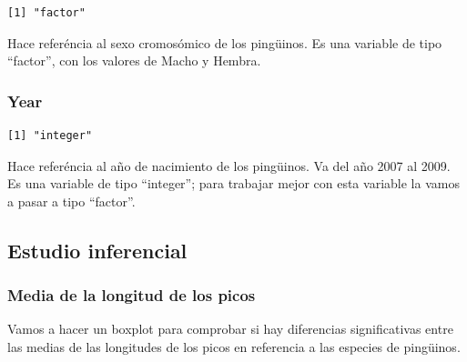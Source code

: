 \documentclass[
  letterpaper,
  DIV=11,
  numbers=noendperiod]{scrartcl}
\newenvironment{Shaded}{\begin{snugshade}}{\end{snugshade}}
\newcommand{\FunctionTok}[1]{\textcolor[rgb]{0.28,0.35,0.67}{#1}}
\newcommand{\NormalTok}[1]{\textcolor[rgb]{0.00,0.23,0.31}{#1}}
\newcommand{\OtherTok}[1]{\textcolor[rgb]{0.00,0.23,0.31}{#1}}
\newcommand{\SpecialCharTok}[1]{\textcolor[rgb]{0.37,0.37,0.37}{#1}}
\begin{document}
\begin{verbatim}
[1] "factor"
\end{verbatim}

Hace referéncia al sexo cromosómico de los pingüinos. Es una variable de
tipo ``factor'', con los valores de Macho y Hembra.

\hypertarget{year}{%
\subsubsection{Year}\label{year}}

\begin{Shaded}
\end{Shaded}

\begin{verbatim}
[1] "integer"
\end{verbatim}

Hace referéncia al año de nacimiento de los pingüinos. Va del año 2007
al 2009. Es una variable de tipo ``integer''; para trabajar mejor con
esta variable la vamos a pasar a tipo ``factor''.

\begin{Shaded}
\end{Shaded}

\hypertarget{estudio-inferencial}{%
\subsection{Estudio inferencial}\label{estudio-inferencial}}

\hypertarget{media-de-la-longitud-de-los-picos}{%
\subsubsection{Media de la longitud de los
picos}\label{media-de-la-longitud-de-los-picos}}

Vamos a hacer un boxplot para comprobar si hay diferencias
significativas entre las medias de las longitudes de los picos en
referencia a las especies de pingüinos.
\end{document}
